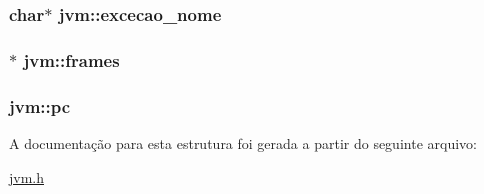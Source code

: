 \subsubsection[{\texorpdfstring{excecao\+\_\+nome}{excecao_nome}}]{\setlength{\rightskip}{0pt plus 5cm}char$\ast$ jvm\+::excecao\+\_\+nome}\hypertarget{structjvm_a471ac752db9424623227c661b194399b}{}\label{structjvm_a471ac752db9424623227c661b194399b}
\subsubsection[{\texorpdfstring{frames}{frames}}]{$\ast$ jvm\+::frames}\hypertarget{structjvm_a4277814c8cb94f0e77f09428d3d668b9}{}\label{structjvm_a4277814c8cb94f0e77f09428d3d668b9}
\subsubsection[{\texorpdfstring{pc}{pc}}]{ jvm\+::pc}\hypertarget{structjvm_ac879eb42576afb2256646f478a7f68c2}{}\label{structjvm_ac879eb42576afb2256646f478a7f68c2}


A documentação para esta estrutura foi gerada a partir do seguinte arquivo\+:\begin{DoxyCompactItemize}
\item 
\hyperlink{jvm_8h}{jvm.\+h}\end{DoxyCompactItemize}
